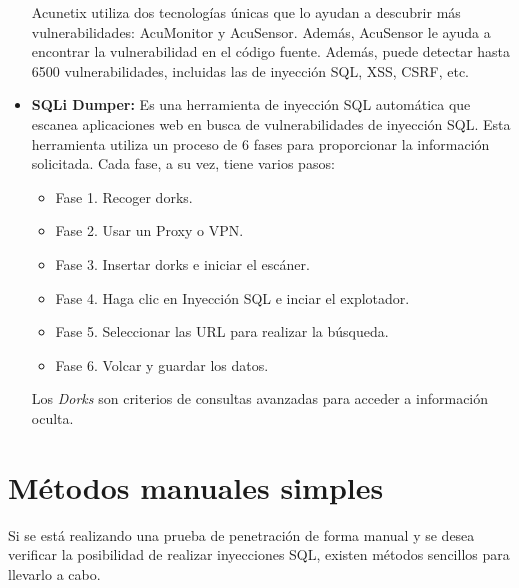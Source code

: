 \documentclass[11pt]{report}
\begin{document}
\begin{itemize}
  Acunetix utiliza dos tecnologías únicas que lo ayudan a descubrir más vulnerabilidades: AcuMonitor y AcuSensor. Además, AcuSensor
  le ayuda a encontrar la vulnerabilidad en el código fuente. Además, puede detectar hasta 6500 vulnerabilidades, incluidas las de
  inyección SQL, XSS, CSRF, etc.

  \item \textbf{SQLi Dumper:} Es una herramienta de inyección SQL automática que escanea aplicaciones web en busca de vulnerabilidades de inyección SQL.
  Esta herramienta utiliza un proceso de 6 fases para proporcionar la información solicitada. Cada fase, a su vez, tiene varios pasos:
  \begin{itemize}
    \item Fase 1. Recoger dorks.
    \item Fase 2. Usar un Proxy o VPN.
    \item Fase 3. Insertar dorks e iniciar el escáner.
    \item Fase 4. Haga clic en Inyección SQL e inciar el explotador.
    \item Fase 5. Seleccionar las URL para realizar la búsqueda.
    \item Fase 6. Volcar y guardar los datos.
  \end{itemize}

  Los \emph{Dorks} son criterios de consultas avanzadas para acceder a información oculta.
\end{itemize}


\section{Métodos manuales simples}
Si se está realizando una prueba de penetración de forma manual y se desea verificar la posibilidad de realizar inyecciones SQL,
existen métodos sencillos para llevarlo a cabo.
\end{document}
